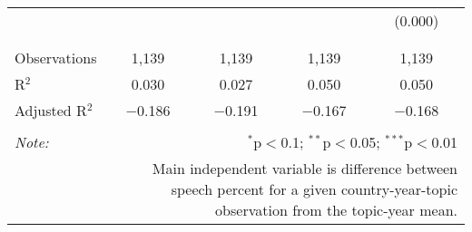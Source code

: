 \begin{table}[!htbp]
\begin{tabular}{@{\extracolsep{5pt}}lcccc}
  &  &  &  & (0.000) \\ 
  & & & & \\ 
\hline \\[-1.8ex] 
Observations & 1,139 & 1,139 & 1,139 & 1,139 \\ 
R$^{2}$ & 0.030 & 0.027 & 0.050 & 0.050 \\ 
Adjusted R$^{2}$ & $-$0.186 & $-$0.191 & $-$0.167 & $-$0.168 \\ 
\hline 
\hline \\[-1.8ex] 
\textit{Note:}  & \multicolumn{4}{r}{$^{*}$p$<$0.1; $^{**}$p$<$0.05; $^{***}$p$<$0.01} \\ 
 & \multicolumn{4}{r}{Main independent variable is difference between speech percent for a given country-year-topic observation from the topic-year mean.} \\ 
\end{tabular} 
\end{table} 
